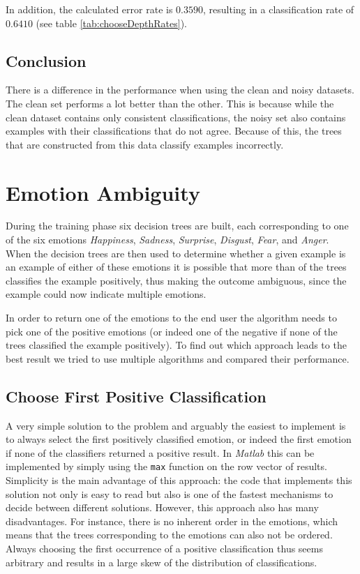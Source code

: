 \documentclass[10pt,a4paper]{article}
\begin{document}
In addition, the calculated error rate is $0.3590$, resulting in a classification rate of $0.6410$ (see table \ref{tab:chooseDepthRates}).

\subsection{Conclusion}

There is a difference in the performance when using the clean and noisy datasets. The clean set performs a lot better than the other. This is because while the clean dataset contains only consistent classifications, the noisy set also contains examples with their classifications that do not agree. Because of this, the trees that are constructed from this data classify examples incorrectly.


\section{Emotion Ambiguity}

During the training phase six decision trees are built, each corresponding to one of the six emotions \emph{Happiness}, \emph{Sadness}, \emph{Surprise}, \emph{Disgust}, \emph{Fear}, and \emph{Anger}. When the decision trees are then used to determine whether a given example is an example of either of these emotions it is possible that more than of the trees classifies the example positively, thus making the outcome ambiguous, since the example could now indicate multiple emotions. 

In order to return one of the emotions to the end user the algorithm needs to pick one of the positive emotions (or indeed one of the negative if none of the trees classified the example positively). To find out which approach leads to the best result we tried to use multiple algorithms and compared their performance.

\subsection{Choose First Positive Classification}

A very simple solution to the problem and arguably the easiest to implement is to always select the first positively classified emotion, or indeed the first emotion if none of the classifiers returned a positive result. In \emph{Matlab} this can be implemented by simply using the \texttt{max} function on the row vector of results. Simplicity is the main advantage of this approach: the code that implements this solution not only is easy to read but also is one of the fastest mechanisms to decide between different solutions. However, this approach also has many disadvantages. For instance, there is no inherent order in the emotions, which means that the trees corresponding to the emotions can also not be ordered. Always choosing the first occurrence of a positive classification thus seems arbitrary and results in a large skew of the distribution of classifications.
\end{document}
